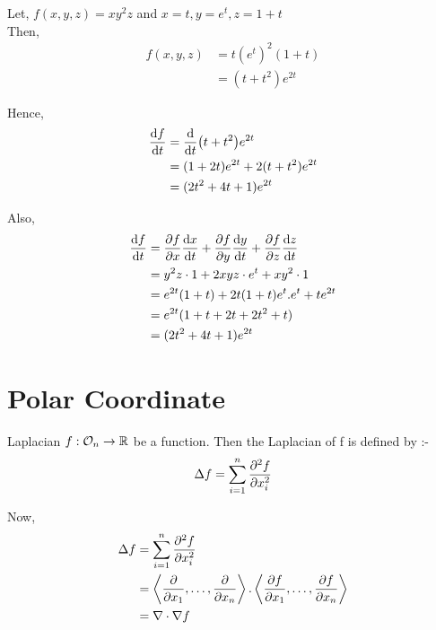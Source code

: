 \documentclass[../Analysis-3]{subfiles}
\begin{document}
\begin{Eg}{}{}
    Let, $f(x,y,z) = xy^{2}z$ and $x=t, y=e^t, z= 1+t$ \\
    Then, \begin{align*}
        f(x,y,z) & = t(e^t)^2(1+t) \\
                 & = (t+t^2)e^{2t}
    \end{align*}

    Hence, \begin{align*}
        \dv{f}{t} & = \dv{t}(t+t^2)e^{2t}           \\
                  & = (1+2t)e^{2t} + 2(t+t^2)e^{2t} \\
                  & = (2t^2+4t+1)e^{2t}
    \end{align*}

    Also, \begin{align*}
        \dv{f}{t} & = \pdv{f}{x} \dv{x}{t} + \pdv{f}{y} \dv{y}{t} + \pdv{f}{z} \dv{z}{t} \\
                  & = y^2z\cdot 1 + 2xyz\cdot e^t + xy^2\cdot 1                          \\
                  & = e^{2t}(1+t) + 2t(1+t)e^t.e^t + te^{2t}                             \\
                  & = e^{2t}(1+t+2t+2t^2+t)                                              \\
                  & = (2t^2+4t+1)e^{2t}
    \end{align*}
\end{Eg}


\section{Polar Coordinate}

\begin{Def}{Laplacian}{}
    $f : \mathcal{O}_{n} \to \mathbb{R}$ be a function. Then the Laplacian of f is defined by :- \[ \Delta f = \sum_{i = 1}^{n} \pdv[2]{f}{x_i}   \]
\end{Def}

Now, \begin{align*}
    \Delta f & = \sum_{i=1}^{n} \pdv[2]{f}{x_i}                                                                                               \\
             & = \left\langle \pdv{}{x_1}, \ldots, \pdv{}{x_n}  \right\rangle. \left\langle \pdv{f}{x_1}, \ldots, \pdv{f}{x_n}  \right\rangle \\
             & = \nabla\cdot\nabla f
\end{align*}
\end{document}
